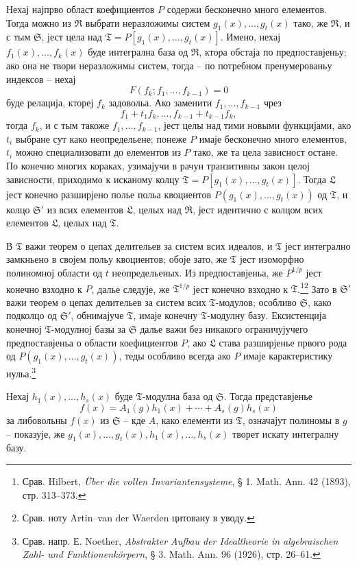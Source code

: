﻿\documentclass[11pt]{article}
\begin{document}
Нехај најпрво област коефициентов $P$ содержи бесконечно много елементов. Тогда можно из $\mathfrak R$ выбрати неразложимы систем $g_1(x),\ldots,g_t(x)$ тако, же $\mathfrak R$, и с тым $\mathfrak S$, јест цела над $\mathfrak T=P[g_1(x),\ldots,g_t(x)]$. Имено, нехај $f_1(x),\ldots,f_k(x)$ буде интегрална база од $\mathfrak R$, ктора обстаја по предпоставјеньу; ако она не твори неразложимы систем, тогда -- по потребном пренумерованьу индексов -- нехај
\[
F(f_k;f_1,\ldots,f_{k-1})=0
\]
буде релација, ктореј $f_k$ задовольа. Ако заменити $f_1,\ldots,f_{k-1}$ чрез
\[
 f_1+t_1f_k,\ldots,f_{k-1}+t_{k-1}f_k,
\]
тогда $f_k$, и с тым такоже $f_1,\ldots,f_{k-1}$, јест целы над тими новыми функцијами, ако $t_i$ выбране сут како неопредельене; понеже $P$ имаје бесконечно много елементов, $t_i$ можно специализовати до елементов из $P$ тако, же та цела зависност остане. По конечно многих кораках, узимајучи в рачун транзитивны закон целој зависности, приходимо к исканому колцу $\mathfrak T=P[g_1(x),\ldots,g_t(x)]$. Тогда $\mathfrak L$ јест конечно разширјено полье польа квоциентов $P(g_1(x),\ldots,g_t(x))$ од $\mathfrak T$, и колцо $\mathfrak S'$ из всих елементов $\mathfrak L$, целых над $\mathfrak R$, јест идентично с колцом всих елементов $\mathfrak L$, целых над $\mathfrak T$.

В $\mathfrak T$ важи теорем о цепах делительев за систем всих идеалов, и $\mathfrak T$ јест интегрално замкньено в својем польу квоциентов; обоје зато, же $\mathfrak T$ јест изоморфно полиномној области од $t$ неопредельеных. Из предпоставјеньа, же $P^{1/p}$ јест конечно взходно к $P$, далье следује, же $\mathfrak T^{1/p}$ јест конечно взходно к $\mathfrak T$.\footnote{Срав. Hilbert, \emph{Über die vollen Invariantensysteme}, § 1. Math. Ann. 42 (1893), стр. 313--373.}\footnote{Срав. ноту Artin--van der Waerden цитовану в уводу.} Зато в $\mathfrak S'$ важи теорем о цепах делительев за систем всих $\mathfrak T$-модулов; особливо $\mathfrak S$, како подколцо од $\mathfrak S'$, обнимајуче $\mathfrak T$, имаје конечну $\mathfrak T$-модулну базу. Ексистенција конечној $\mathfrak T$-модулној базы за $\mathfrak S$ далье важи без никакого ограничујучего предпоставјеньа о области коефициентов $P$, ако $\mathfrak L$ става разширјенье првого рода од $P(g_1(x),\ldots,g_t(x))$, теды особливо всегда ако $P$ имаје карактеристику нульа.\footnote{Срав. напр. Е. Noether, \emph{Abstrakter Aufbau der Idealtheorie in algebraischen Zahl- und Funktionenkörpern}, § 3. Math. Ann. 96 (1926), стр. 26--61.}

Нехај $h_1(x),\ldots,h_s(x)$ буде $\mathfrak T$-модулна база од $\mathfrak S$. Тогда представјенье
\[
 f(x)=A_1(g)h_1(x)+\cdots+A_s(g)h_s(x)
\]
за либовольны $f(x)$ из $\mathfrak S$ -- кде $A$, како елементи из $\mathfrak T$, означајут полиномы в $g$ -- показује, же $g_1(x),\ldots,g_t(x),h_1(x),\ldots,h_s(x)$ творет искату интегралну базу.
\end{document}
